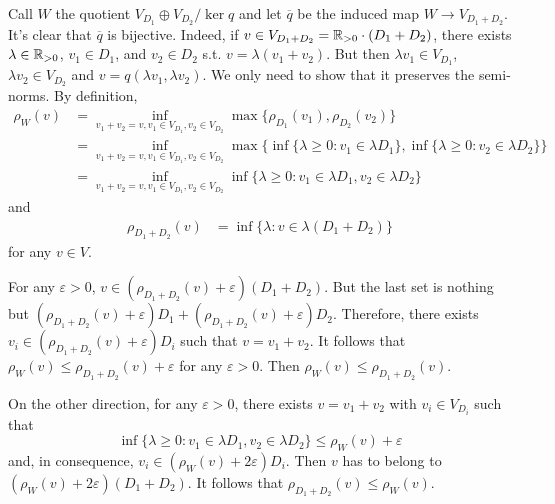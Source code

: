\ExerciseSection

\begin{solution}
Call $W$ the quotient $V_{D_1}\oplus V_{D_2}/ \ker{q}$ and let $\overline{q}$  be the induced map $W \to V_{D_1+D_2}$. It's clear that $\overline{q}$ is bijective. Indeed, if $v \in V_{D_1+D_2}=\mathbb R_{> 0}\cdot (D_1+D_2)$, there exists $\lambda\in \mathbb R_{> 0}$, $v_1\in D_1$, and $v_2\in D_2$ s.t. $v= \lambda(v_1+v_2)$. But then $\lambda v_1 \in V_{D_1}$, $\lambda v_2\in V_{D_2}$ and $v=q(\lambda v_1,\lambda v_2)$. We only need to show that it preserves the semi-norms. By definition, 
\begin{align*}
    \rho_{W}(v)&= \inf_{v_1+v_2=v,v_1\in V_{D_1},v_2\in V_{D_2}}\max\{\rho_{D_1}(v_1),\rho_{D_2}(v_2)\}\\
    &= \inf_{v_1+v_2=v,v_1\in V_{D_1},v_2\in V_{D_2}}\max\{\inf\{\lambda\geq 0:v_1\in \lambda D_1\},\inf\{\lambda\geq 0:v_2\in \lambda D_2\}\}\\
    &= \inf_{v_1+v_2=v,v_1\in V_{D_1},v_2\in V_{D_2}}\inf\{\lambda\geq 0:v_1\in \lambda D_1, v_2\in \lambda D_2\} 
\end{align*}
and 
\begin{align*}
    \rho_{D_1+D_2}(v)&=\inf\{\lambda: v\in \lambda(D_1+D_2)\}
\end{align*}
for any $v\in V$. 

For any $\varepsilon > 0$, $v \in (\rho_{D_1+D_2}(v)+\varepsilon)(D_1+D_2)$. But the last set is nothing but $(\rho_{D_1+D_2}(v)+\varepsilon)D_1+(\rho_{D_1+D_2}(v)+\varepsilon)D_2 $. Therefore, there exists $v_i\in (\rho_{D_1+D_2}(v)+\varepsilon)D_i$ such that $v=v_1+v_2$. It follows that $\rho_W(v)\leq \rho_{D_1+D_2}(v)+\varepsilon$ for any $\varepsilon>0$. Then $\rho_W(v)\leq \rho_{D_1+D_2}(v)$.

On the other direction, for any $\varepsilon > 0$, there exists $v=v_1+v_2$ with $v_i\in V_{D_i}$ such that 
\[\inf\{\lambda\geq 0:v_1\in \lambda D_1, v_2\in \lambda D_2\} \leq \rho_W(v)+\varepsilon\]
and, in consequence, $v_i\in (\rho_W(v)+2\varepsilon)D_i$. Then $v$ has to belong to $(\rho_W(v)+2\varepsilon)(D_1+D_2)$. It follows that $\rho_{D_1+D_2}(v)\leq \rho_W(v)$.
\end{solution}  

